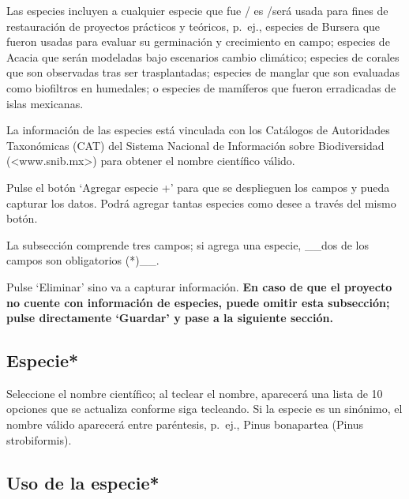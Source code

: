 \documentclass[
]{book}
\begin{document}
Las especies incluyen a cualquier especie que fue / es /será usada para fines de restauración de proyectos prácticos y teóricos, p.~ej., especies de Bursera que fueron usadas para evaluar su germinación y crecimiento en campo; especies de Acacia que serán modeladas bajo escenarios cambio climático; especies de corales que son observadas tras ser trasplantadas; especies de manglar que son evaluadas como biofiltros en humedales; o especies de mamíferos que fueron erradicadas de islas mexicanas.

La información de las especies está vinculada con los Catálogos de Autoridades Taxonómicas (CAT) del Sistema Nacional de Información sobre Biodiversidad (\textless www.snib.mx\textgreater) para obtener el nombre científico válido.

Pulse el botón `Agregar especie +' para que se desplieguen los campos y pueda capturar los datos. Podrá agregar tantas especies como desee a través del mismo botón.

La subsección comprende tres campos; si agrega una especie, \_\_dos de los campos son obligatorios (*)\_\_.

Pulse `Eliminar' sino va a capturar información.
\textbf{En caso de que el proyecto no cuente con información de especies, puede omitir esta subsección; pulse directamente `Guardar' y pase a la siguiente sección.}

\hypertarget{especie}{%
\subsection{Especie*}\label{especie}}

Seleccione el nombre científico; al teclear el nombre, aparecerá una lista de 10 opciones que se actualiza conforme siga tecleando. Si la especie es un sinónimo, el nombre válido aparecerá entre paréntesis, p.~ej., Pinus bonapartea (Pinus strobiformis).

\hypertarget{uso-de-la-especie}{%
\subsection{Uso de la especie*}\label{uso-de-la-especie}}
\end{document}
